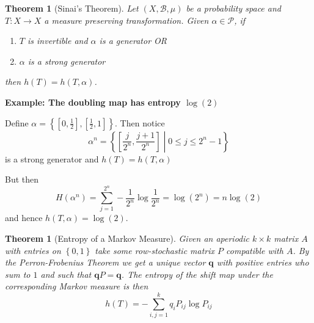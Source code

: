 \documentclass[11pt]{article}
\newcommand{\relmiddle}[1]{\mathrel{}\middle#1\mathrel{}}
\newcommand{\rmv}{\relmiddle|}
\newcommand{\mv}[1]{\textbf{#1}}
\newenvironment{eg}
	{\begin{mdframed}[backgroundcolor=mylg,roundcorner=5pt,linewidth=0pt]\bfseries{Example:}\normalfont}
	{\end{mdframed}}
\newtheorem{theorem}[prop]{Theorem}
\begin{document}
\begin{theorem}[Sinai's Theorem]
Let $(X, \mathcal{B}, \mu)$ be a probability space and $T:X \to X$ a measure preserving transformation.
Given $\alpha\in\mathcal{P}$, if
\begin{enumerate}
	\item $T$ is invertible and $\alpha$ is a generator OR
	\item $\alpha$ is a strong generator
\end{enumerate}
then $h(T) = h(T, \alpha)$.
\end{theorem}

\begin{eg}
	\textbf{The doubling map has entropy $\log(2)$}

	Define $\alpha = \left\{ \left[ 0, \frac{1}{2}\right], \left[ \frac{1}{2}, 1\right]\right\}$.
	Then notice
	\[
		\alpha^n = \left\{ \left[ \frac{j}{2^n}, \frac{j+1}{2^n}\right] \rmv 0 \leq j \leq 2^n -1\right\}
	\]
	is a strong generator and $h(T) = h(T, \alpha)$

	But then
	\[
		H(\alpha^n) = \sum_{j=1}^{2^n}-\frac{1}{2^n}\log\frac{1}{2^n}=\log(2^n) = n\log(2)
	\]
	and hence $h(T, \alpha) = \log(2)$.
\end{eg}

\begin{theorem}[Entropy of a Markov Measure]
Given an aperiodic $k\times k$ matrix $A$ with entries on $\left\{ 0, 1\right\}$ take some row-stochastic matrix $P$ compatible with $A$.
By the Perron-Frobenius Theorem we get a unique vector $\mv{q}$ with positive entries who sum to $1$ and such that $\mv{q}P = \mv{q}$.
The entropy of the shift map under the corresponding Markov measure is then
\[
	h(T) = -\sum_{i, j=1}^{k}q_i P_{ij}\log P_{ij}
\]
\end{theorem}
\end{document}
